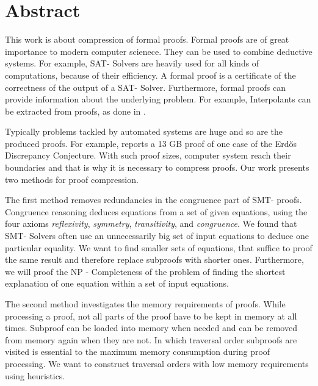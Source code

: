 \chapter*{Abstract}

This work is about compression of formal proofs.
Formal proofs are of great importance to modern computer scienece.
They can be used to combine deductive systems.
For example, SAT- Solvers \cite{Biere2009} are heavily used for all kinds of computations, because of their efficiency.
A formal proof is a certificate of the correctness of the output of a SAT- Solver.
Furthermore, formal proofs can provide information about the underlying problem.
For example, Interpolants \cite{McMill2005} can be extracted from proofs, as done in \cite{Hofferek2013}.

Typically problems tackled by automated systems are huge and so are the produced proofs.
For example, \cite{Konev2014} reports a 13 GB proof of one case of the Erd\H{o}s Discrepancy Conjecture.
With such proof sizes, computer system reach their boundaries and that is why it is necessary to compress proofs.
Our work presents two methods for proof compression.

The first method removes redundancies in the congruence part of SMT- proofs.
Congruence reasoning deduces equations from a set of given equations, using the four axioms \emph{reflexivity}, \emph{symmetry}, \emph{transitivity}, and \emph{congruence}.
We found that SMT- Solvers often use an unnecessarily big set of input equations to deduce one particular equality.
We want to find smaller sets of equations, that suffice to proof the same result and therefore replace subproofs with shorter ones.
Furthermore, we will proof the NP - Completeness of the problem of finding the shortest explanation of one equation within a set of input equations.

The second method investigates the memory requirements of proofs.
While processing a proof, not all parts of the proof have to be kept in memory at all times.
Subproof can be loaded into memory when needed and can be removed from memory again when they are not.
In which traversal order subproofs are visited is essential to the maximum memory consumption during proof processing.
We want to construct traversal orders with low memory requirements using heuristics. 
